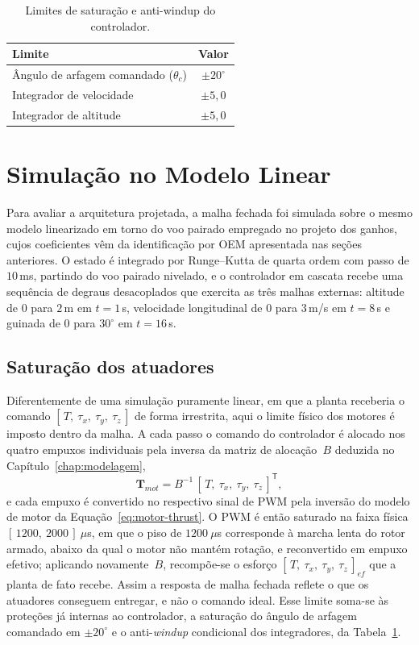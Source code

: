 \begin{table}[ht]
\centering
\caption{Limites de saturação e anti-windup do controlador.}
\label{tab:ctrl-lim}
\begin{tabular}{l c}
\toprule
Limite & Valor \\
\midrule
Ângulo de arfagem comandado ($\theta_c$) & $\pm 20^\circ$ \\
Integrador de velocidade & $\pm 5{,}0$ \\
Integrador de altitude   & $\pm 5{,}0$ \\
\bottomrule
\end{tabular}
\end{table}

\section{Simulação no Modelo Linear}
\label{sec:sim-linear}

Para avaliar a arquitetura projetada, a malha fechada foi simulada sobre o mesmo modelo linearizado em torno do voo pairado empregado no projeto dos ganhos, cujos coeficientes vêm da identificação por OEM apresentada nas seções anteriores. O estado é integrado por Runge--Kutta de quarta ordem com passo de $10$\,ms, partindo do voo pairado nivelado, e o controlador em cascata recebe uma sequência de degraus desacoplados que exercita as três malhas externas: altitude de $0$ para $2$\,m em $t=1$\,s, velocidade longitudinal de $0$ para $3$\,m/s em $t=8$\,s e guinada de $0$ para $30^\circ$ em $t=16$\,s.

\subsection{Saturação dos atuadores}

Diferentemente de uma simulação puramente linear, em que a planta receberia o comando $[\,T,\ \tau_x,\ \tau_y,\ \tau_z\,]$ de forma irrestrita, aqui o limite físico dos motores é imposto dentro da malha. A cada passo o comando do controlador é alocado nos quatro empuxos individuais pela inversa da matriz de alocação~$B$ deduzida no Capítulo~\ref{chap:modelagem},
\begin{equation}
\mathbf{T}_{mot}=B^{-1}\,[\,T,\ \tau_x,\ \tau_y,\ \tau_z\,]^{\mathsf{T}} ,
\label{eq:aloc-inv}
\end{equation}
e cada empuxo é convertido no respectivo sinal de PWM pela inversão do modelo de motor da Equação~\eqref{eq:motor-thrust}. O PWM é então saturado na faixa física $[\,1200,\ 2000\,]\ \mu$s, em que o piso de $1200\ \mu$s corresponde à marcha lenta do rotor armado, abaixo da qual o motor não mantém rotação, e reconvertido em empuxo efetivo; aplicando novamente~$B$, recompõe-se o esforço $[\,T,\ \tau_x,\ \tau_y,\ \tau_z\,]_{ef}$ que a planta de fato recebe. Assim a resposta de malha fechada reflete o que os atuadores conseguem entregar, e não o comando ideal. Esse limite soma-se às proteções já internas ao controlador, a saturação do ângulo de arfagem comandado em $\pm 20^\circ$ e o anti-\textit{windup} condicional dos integradores, da Tabela~\ref{tab:ctrl-lim}.

